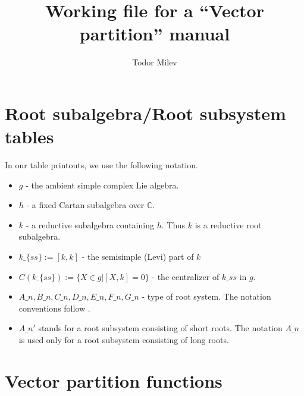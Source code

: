 \documentclass{article}
\title{Working file for a ``Vector partition'' manual}
\author{Todor Milev}
\begin{document}
\maketitle
\tableofcontents

\section{Root subalgebra/Root subsystem tables}
In our table printouts, we use the following notation. 
\begin{itemize}
\item $g$ - the ambient simple complex Lie algebra.
\item $h$ - a fixed Cartan subalgebra over $\mathbb{C}$.
\item $k$ - a reductive subalgebra containing $h$. Thus $k$ is a reductive root subalgebra.
\item $k\_\{ss\}:=[k,k]$ - the semisimple (Levi) part of $k$
\item $C(k\_\{ss\}):=\{X\in g| [X,k]=0\}$ - the centralizer of $k\_ss$ in $g$. 
\item $A\_n, B\_n,C\_n, D\_n, E\_n, F\_n, G\_n$ - type of root system. The notation conventions follow \cite[Chapter III]{Humphreys}.
\item $A\_n'$ stands for a root subsystem consisting of short roots. The notation $A\_n$ is used only for a root subsystem consisting of long roots. 
\end{itemize}

\section{Vector partition functions}



\end{document}
